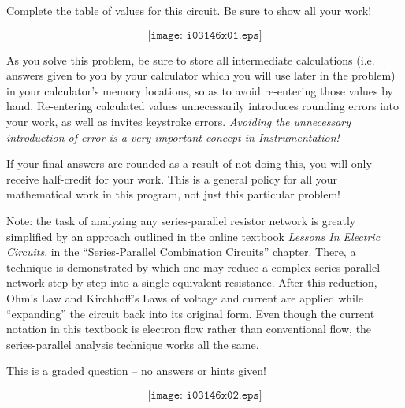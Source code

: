 

Complete the table of values for this circuit.  Be sure to show all your work!

$$\texttt{[image: i03146x01.eps]}$$

As you solve this problem, be sure to store all intermediate calculations (i.e. answers given to you by your calculator which you will use later in the problem) in your calculator's memory locations, so as to avoid re-entering those values by hand.  Re-entering calculated values unnecessarily introduces rounding errors into your work, as well as invites keystroke errors.  {\it Avoiding the unnecessary introduction of error is a very important concept in Instrumentation!}

If your final answers are rounded as a result of not doing this, you will only receive half-credit for your work.  This is a general policy for all your mathematical work in this program, not just this particular problem!

\vfil 

Note: the task of analyzing any series-parallel resistor network is greatly simplified by an approach outlined in the online textbook {\it Lessons In Electric Circuits}, in the ``Series-Parallel Combination Circuits'' chapter.  There, a technique is demonstrated by which one may reduce a complex series-parallel network step-by-step into a single equivalent resistance.  After this reduction, Ohm's Law and Kirchhoff's Laws of voltage and current are applied while ``expanding'' the circuit back into its original form.  Even though the current notation in this textbook is electron flow rather than conventional flow, the series-parallel analysis technique works all the same.

\eject






This is a graded question -- no answers or hints given!







$$\texttt{[image: i03146x02.eps]}$$



